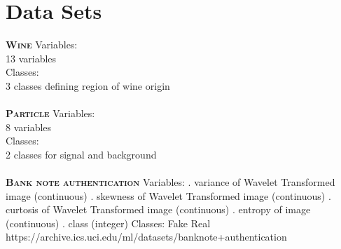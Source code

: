 \documentclass[a4paper,11pt,twoside]{article}
\begin{document}
\section{Data Sets}

\textsc{\large \bf Wine}\newline
Variables:\\
13 variables\\
Classes:\\
3 classes defining region of wine origin\\
\\
\textsc{\large \bf Particle}\newline
Variables:\\
8 variables\\
Classes:\\
2 classes for signal and background\\
\\
\textsc{\large 
\bf Bank note authentication}\newline
Variables:
. variance of Wavelet Transformed image (continuous) . skewness of Wavelet Transformed image (continuous) . curtosis of Wavelet Transformed image (continuous) . entropy of image (continuous) . class (integer) \newline
Classes: Fake Real\newline
https://archive.ics.uci.edu/ml/datasets/banknote+authentication
\\~\\
\end{document}
